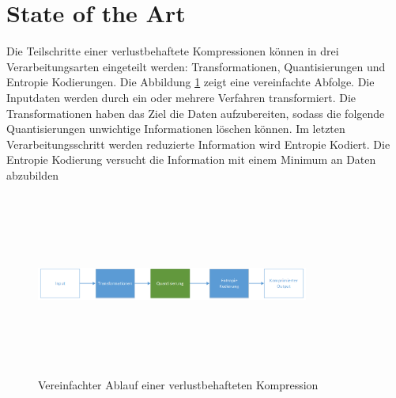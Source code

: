 \section{State of the Art}
Die Teilschritte einer verlustbehaftete Kompressionen können in drei Verarbeitungsarten eingeteilt werden: Transformationen, Quantisierungen und Entropie Kodierungen. Die Abbildung \ref{state:aufbau} zeigt eine vereinfachte Abfolge. Die Inputdaten werden durch ein oder mehrere Verfahren transformiert. Die Transformationen haben das Ziel die Daten aufzubereiten, sodass die folgende Quantisierungen unwichtige Informationen löschen können. Im letzten Verarbeitungsschritt werden reduzierte Information wird Entropie Kodiert. Die Entropie Kodierung versucht die Information mit einem Minimum an Daten abzubilden\\
\begin{figure}[!htbp]
	\center
	\includegraphics[width=0.8\textwidth,height=6cm,keepaspectratio]{./pictures/state/aufbau.png}
	\caption{Vereinfachter Ablauf einer verlustbehafteten Kompression}
	\label{state:aufbau}
\end{figure}

